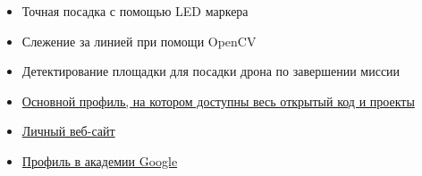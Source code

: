 

\begin{itemize}
\item Точная посадка с помощью LED маркера
\end{itemize}
\smallskip

\begin{itemize}
\item Слежение за линией при помощи OpenCV
\item Детектирование площадки для посадки дрона по завершении миссии
\end{itemize}
\smallskip



\begin{itemize}
\item \href{https://github.com/sevocrear}{Основной профиль, на котором доступны весь открытый код и проекты}
\end{itemize}
\smallskip

\begin{itemize}
\item \href{https://sevocrear.github.io/en/}{Личный веб-сайт}
\end{itemize}
\smallskip

\begin{itemize}
\item \href{https://scholar.google.ru/citations?user=P1qdrucAAAAJ&hl=ru}{Профиль в академии Google}
\end{itemize}
\smallskip

\smallskip